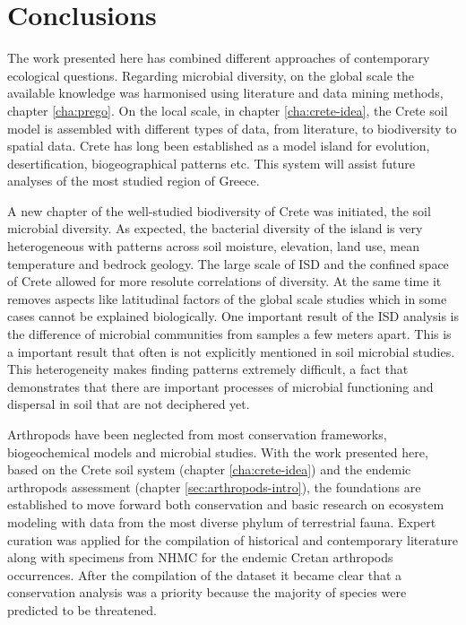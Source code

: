 % 
% 

\chapter{Conclusions}
\label{cha:conclusions}

The work presented here has combined different approaches of contemporary 
ecological questions.
Regarding microbial diversity, on the global scale the available 
knowledge was harmonised using literature and data mining methods, chapter \ref{cha:prego}.
On the local scale,
in chapter \ref{cha:crete-idea}, the Crete soil model is assembled 
with different types of data, from literature, to biodiversity to spatial data. 
Crete has long been established as a model island for evolution, desertification, biogeographical patterns etc.
This system will assist future analyses of the most studied region of Greece.

A new chapter of the well-studied biodiversity of Crete was initiated, 
the soil microbial diversity.
As expected, the bacterial diversity of the island is very heterogeneous 
with patterns across soil moisture, elevation, land use, mean temperature and bedrock geology.
The large scale of ISD and the confined space of Crete allowed for more resolute 
correlations of diversity. At the same time it removes aspects like latitudinal factors
of the global scale studies which in some cases cannot be explained biologically. 
One important result of the ISD analysis is the difference of microbial 
communities from samples a few meters apart. This is a important result
that often is not explicitly mentioned in soil microbial studies. This heterogeneity 
makes finding patterns extremely difficult, a fact that demonstrates that
there are important processes of microbial functioning and
dispersal in soil that are not deciphered yet.

Arthropods have been neglected from most conservation frameworks, biogeochemical models
and microbial studies. With the work presented here,
based on the Crete soil system (chapter \ref{cha:crete-idea})
and the endemic arthropods assessment (chapter \ref{sec:arthropods-intro}),
the foundations are established to move forward both 
conservation and basic research on ecosystem modeling with 
data from the most diverse phylum of terrestrial fauna.
Expert curation was applied for the compilation of historical and contemporary
literature along with specimens from NHMC for the endemic Cretan arthropods occurrences.
After the compilation of the dataset it became clear that a conservation analysis
was a priority because the majority of species were predicted to be threatened.

